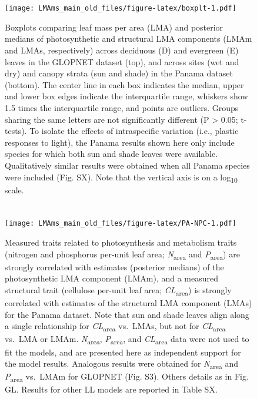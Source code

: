 \documentclass[
  12pt,
]{article}
\begin{document}
\newpage

\hypertarget{section-6}{%
\section{}\label{section-6}}

\begin{figure}
\centering
\texttt{[image: LMAms\_main\_old\_files/figure-latex/boxplt-1.pdf]}
\caption{\label{fig:boxplt}Boxplots comparing leaf mass per area (LMA) and posterior medians of photosynthetic and structural LMA components (LMAm and LMAs, respectively) across deciduous (D) and evergreen (E) leaves in the GLOPNET dataset (top), and across sites (wet and dry) and canopy strata (sun and shade) in the Panama dataset (bottom). The center line in each box indicates the median, upper and lower box edges indicate the interquartile range, whiskers show 1.5 times the interquartile range, and points are outliers. Groups sharing the same letters are not significantly different (P \textgreater{} 0.05; t-tests). To isolate the effects of intraspecific variation (i.e., plastic responses to light), the Panama results shown here only include species for which both sun and shade leaves were available. Qualitatively similar results were obtained when all Panama species were included (Fig. SX). Note that the vertical axis is on a log\textsubscript{10} scale.}
\end{figure}

\newpage

\hypertarget{section-7}{%
\section{}\label{section-7}}

\begin{figure}
\centering
\texttt{[image: LMAms\_main\_old\_files/figure-latex/PA-NPC-1.pdf]}
\caption{\label{fig:PA-NPC}Measured traits related to photosynthesis and metabolism traits (nitrogen and phosphorus per-unit leaf area; \emph{N}\textsubscript{area} and \emph{P}\textsubscript{area}) are strongly correlated with estimates (posterior medians) of the photosynthetic LMA component (LMAm), and a measured structural trait (cellulose per-unit leaf area; \emph{CL}\textsubscript{area}) is strongly correlated with estimates of the structural LMA component (LMAs) for the Panama dataset. Note that sun and shade leaves align along a single relationship for \emph{CL}\textsubscript{area} vs.~LMAs, but not for \emph{CL}\textsubscript{area} vs.~LMA or LMAm. \emph{N}\textsubscript{area}, \emph{P}\textsubscript{area}, and \emph{CL}\textsubscript{area} data were not used to fit the models, and are presented here as independent support for the model results. Analogous results were obtained for \emph{N}\textsubscript{area} and \emph{P}\textsubscript{area} vs.~LMAm for GLOPNET (Fig. S3). Others details as in Fig. GL. Results for other LL models are reported in Table SX.}
\end{figure}
\end{document}
